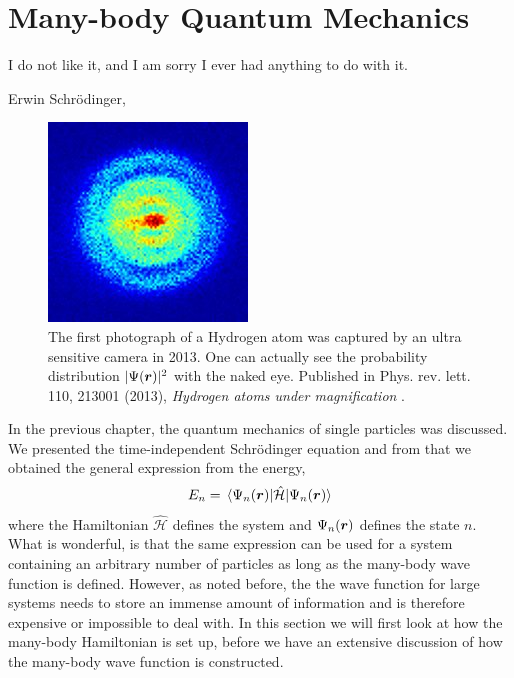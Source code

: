 \chapter{Many-body Quantum Mechanics} \label{chp:manybody}
\epigraph{I do not like it, and I am sorry I ever had anything to do with it.}{Erwin Schrödinger, \cite{noauthor_quantum_2005}}
\begin{figure}[H]
	\centering
	\captionsetup[subfigure]{labelformat=empty}
	\includegraphics[scale=3.0]{Images/art_quantum.jpg}
	\caption{The first photograph of a Hydrogen atom was captured by an ultra sensitive camera in 2013. One can actually see the probability distribution $|\Psi(\boldsymbol{{r}})|^2$ with the naked eye. Published in Phys. rev. lett. 110, 213001 (2013), \textit{Hydrogen atoms under magnification} \cite{stodolna_hydrogen_2013}.}
\end{figure}

In the previous chapter, the quantum mechanics of single particles was discussed. We presented the time-independent Schrödinger equation and from that we obtained the general expression from the energy,
\begin{equation}
E_n=\mel{\Psi_n(\bs{r})}{\hat{\mathcal{H}}}{\Psi_n(\bs{r})}
\label{eq:energy}
\end{equation}
where the Hamiltonian $\hat{\mathcal{H}}$ defines the system and $\Psi_n(\boldsymbol{{r}})$ defines the state $n$. What is wonderful, is that the same expression can be used for a system containing an arbitrary number of particles as long as the many-body wave function is defined. However, as noted before, the the wave function for large systems needs to store an immense amount of information and is therefore expensive or impossible to deal with. In this section we will first look at how the many-body Hamiltonian is set up, before we have an extensive discussion of how the many-body wave function is constructed.

